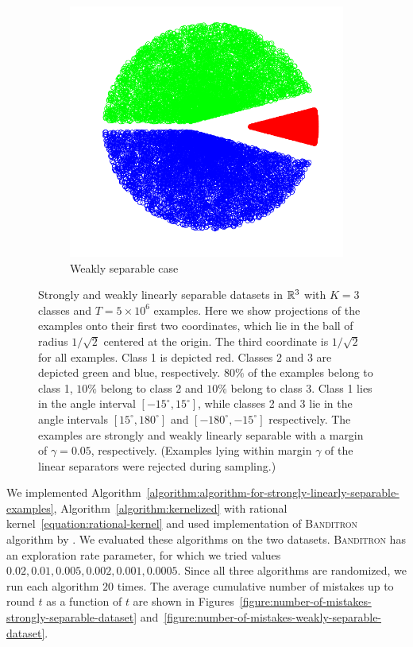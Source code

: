 \begin{figure}[h]
\begin{subfigure}[b]{0.23\textwidth}
\includegraphics[width=\textwidth, trim={0, 0cm, 0, 0}, clip]{figures/weak_points}
\caption{Weakly separable case}
\label{figure:weakly-separable-dataset}
\end{subfigure}
\caption{Strongly and weakly linearly separable datasets in $\mathbb{R}^3$ with $K=3$
classes and $T=5\times 10^6$ examples. Here we show projections of the examples
onto their first two coordinates, which lie in the ball of radius $1/\sqrt{2}$
centered at the origin. The third coordinate is $1/\sqrt{2}$ for all examples.
Class 1 is depicted red. Classes 2 and 3 are depicted green and blue,
respectively. $80\%$ of the examples belong to class 1, $10\%$ belong to class 2
and $10\%$ belong to class 3. Class 1 lies in the angle interval $[-15^\circ,
15^\circ]$, while classes 2 and 3 lie in the angle intervals $[15^\circ,
180^\circ]$ and $[-180^\circ, -15^\circ]$ respectively. The examples are
strongly and weakly linearly separable with a margin of $\gamma=0.05$,
respectively. (Examples lying within margin $\gamma$ of the linear separators
were rejected during sampling.)}
\label{figure:strongly-and-weakly-separable-datasets}
\end{figure}

We implemented
Algorithm~\ref{algorithm:algorithm-for-strongly-linearly-separable-examples},
Algorithm~\ref{algorithm:kernelized} with rational
kernel~\eqref{equation:rational-kernel} and used implementation of
\textsc{Banditron} algorithm by \citet{Orabona09}. We evaluated these algorithms
on the two datasets. \textsc{Banditron} has an exploration rate parameter, for
which we tried values $0.02, 0.01, 0.005, 0.002, 0.001, 0.0005$. Since all three
algorithms are randomized, we run each algorithm $20$ times. The average
cumulative number of mistakes up to round $t$ as a function of $t$ are shown in
Figures~\ref{figure:number-of-mistakes-strongly-separable-dataset}
and~\ref{figure:number-of-mistakes-weakly-separable-dataset}.

